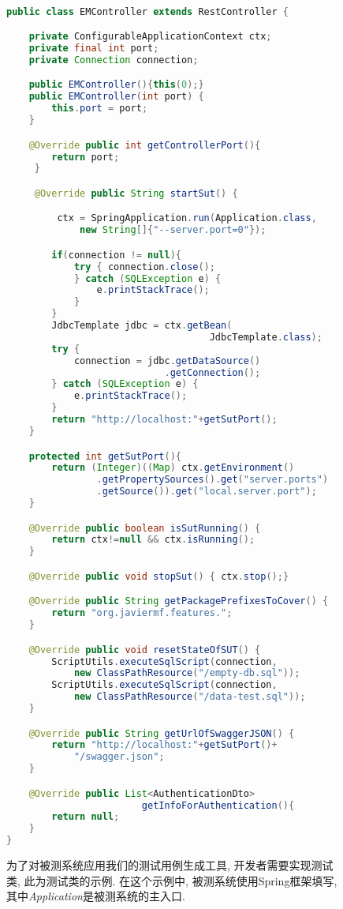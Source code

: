   \begin{figure}
        {
        \tt
        \tiny
      \begin{lstlisting}[language=java]
public class EMController extends RestController {

    private ConfigurableApplicationContext ctx;
    private final int port;
    private Connection connection;

    public EMController(){this(0);}
    public EMController(int port) {
        this.port = port;
    }

    @Override public int getControllerPort(){
        return port;
     }

     @Override public String startSut() {

         ctx = SpringApplication.run(Application.class,
             new String[]{"--server.port=0"});

        if(connection != null){
            try { connection.close();
            } catch (SQLException e) {
                e.printStackTrace();
            }
        }
        JdbcTemplate jdbc = ctx.getBean(
                                    JdbcTemplate.class);
        try {
            connection = jdbc.getDataSource()
                            .getConnection();
        } catch (SQLException e) {
            e.printStackTrace();
        }
        return "http://localhost:"+getSutPort();
    }

    protected int getSutPort(){
        return (Integer)((Map) ctx.getEnvironment()
                .getPropertySources().get("server.ports")
                .getSource()).get("local.server.port");
    }

    @Override public boolean isSutRunning() {
        return ctx!=null && ctx.isRunning();
    }

    @Override public void stopSut() { ctx.stop();}

    @Override public String getPackagePrefixesToCover() {
        return "org.javiermf.features.";
    }

    @Override public void resetStateOfSUT() {
        ScriptUtils.executeSqlScript(connection,
            new ClassPathResource("/empty-db.sql"));
        ScriptUtils.executeSqlScript(connection,
            new ClassPathResource("/data-test.sql"));
    }

    @Override public String getUrlOfSwaggerJSON() {
        return "http://localhost:"+getSutPort()+
            "/swagger.json";
    }

    @Override public List<AuthenticationDto>
                        getInfoForAuthentication(){
        return null;
    }
}
    \end{lstlisting}
        }
        \caption[]{为了对被测系统应用我们的测试用例生成工具, 开发者需要实现测试类, 此为测试类的示例. 在这个示例中, 被测系统使用Spring框架填写, 其中\textit{Application}是被测系统的主入口. }
        \label{fig4}
    \end{figure}

